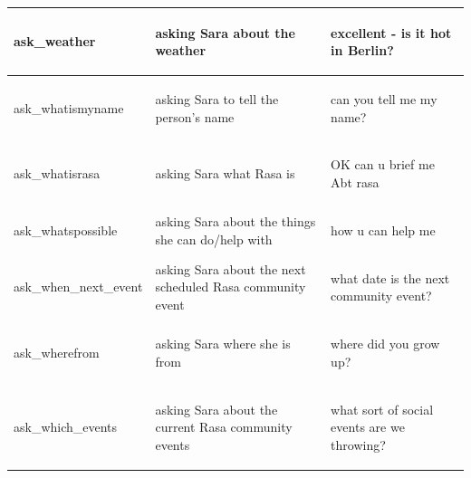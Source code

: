 \documentclass[bsc,frontabs,singlespacing,parskip,deptreport]{infthesis}
\begin{document}
{\begin{center}
\begin{longtable}{p{}|p{}|p{}}
    \hline
    \begin{spverbatim}ask_weather\end{spverbatim} & asking Sara about the weather & \begin{spverbatim}excellent - is it hot in Berlin?\end{spverbatim} \\
    \hline
    \begin{spverbatim}ask_whatismyname\end{spverbatim} & asking Sara to tell the person's name & \begin{spverbatim}can you tell me my name?\end{spverbatim} \\
    \hline
    \begin{spverbatim}ask_whatisrasa\end{spverbatim} & asking Sara what Rasa is & \begin{spverbatim}OK can u brief me Abt rasa\end{spverbatim} \\
    \hline
    \begin{spverbatim}ask_whatspossible\end{spverbatim} & asking Sara about the things she can do/help with & \begin{spverbatim}how u can help me\end{spverbatim} \\
    \hline
    \begin{spverbatim}ask_when_next_event\end{spverbatim} & asking Sara about the next scheduled Rasa community event & \begin{spverbatim}what date is the next community event?\end{spverbatim} \\
    \hline
    \begin{spverbatim}ask_wherefrom\end{spverbatim} & asking Sara where she is from & \begin{spverbatim}where did you grow up?\end{spverbatim} \\
    \hline
    \begin{spverbatim}ask_which_events\end{spverbatim} & asking Sara about the current Rasa community events & \begin{spverbatim}what sort of social events are we throwing?\end{spverbatim} \\

\end{longtable}
\end{center}}
\end{document}

